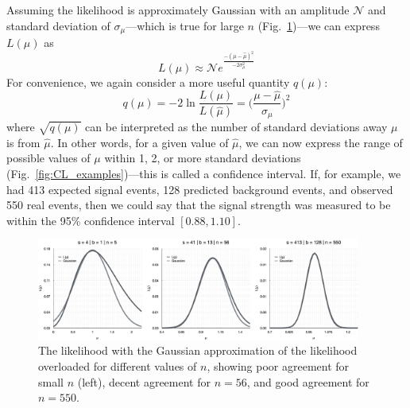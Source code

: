 Assuming the likelihood is approximately Gaussian\footnotemark{} with an amplitude $\mathcal{N}$ and standard deviation of $\sigma_\mu$---which is true for large $n$ (Fig.~\ref{fig:like_gauss_approx})---we can express $L(\mu)$ as
\begin{equation}
    L(\mu) \approx \mathcal{N}e^{\frac{-(\mu - \hat{\mu})^2}{-2\sigma^2_\mu}}
\end{equation}
For convenience, we again consider a more useful quantity $q(\mu)$:
\begin{equation}
    q(\mu) = -2\ln\frac{L(\mu)}{L(\hat{\mu})} = \bigg(\frac{\mu - \hat{\mu}}{\sigma_\mu}\bigg)^2
\end{equation}
where $\sqrt{q(\mu)}$ can be interpreted as the number of standard deviations away $\mu$ is from $\hat{\mu}$. 
In other words, for a given value of $\hat{\mu}$, we can now express the range of possible values of $\mu$ within 1, 2, or more standard deviations (Fig.~\ref{fig:CL_examples})---this is called a confidence interval. 
If, for example, we had 413 expected signal events, 128 predicted background events, and observed 550 real events, then we could say that the signal strength was measured to be within the 95\% confidence interval $[0.88, 1.10]$. 

\begin{figure}[htb]
    \centering
    \includegraphics[width=0.95\textwidth]{fig/stats/like_gauss_approx.png}
    \caption[The likelihood with the Gaussian approximation of the likelihood overlaid]{
        The likelihood with the Gaussian approximation of the likelihood overloaded for different values of $n$, showing poor agreement for small $n$ (left), decent agreement for $n = 56$, and good agreement for $n = 550$.
    }
    \label{fig:like_gauss_approx}
\end{figure}

